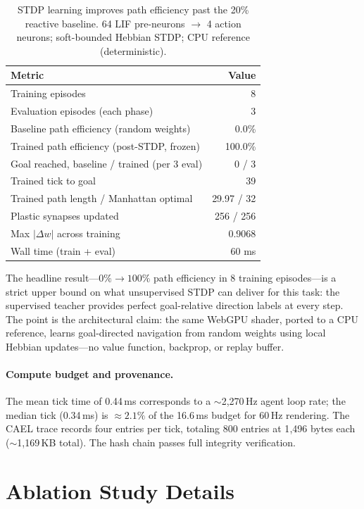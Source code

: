 \documentclass[10pt]{article}
\newcommand{\cael}{CAEL}
\begin{document}
\begin{table}[h]\centering
\caption{STDP learning improves path efficiency past the 20\% reactive baseline.
64 LIF pre-neurons $\to$ 4 action neurons; soft-bounded Hebbian STDP; CPU
reference (deterministic).}
\label{tab:stdp-nav-experiment}
\begin{tabular}{lr}
\toprule
Metric & Value \\
\midrule
Training episodes & 8 \\
Evaluation episodes (each phase) & 3 \\
Baseline path efficiency (random weights) & 0.0\% \\
Trained path efficiency (post-STDP, frozen) & 100.0\% \\
Goal reached, baseline / trained (per 3 eval) & 0 / 3 \\
Trained tick to goal & 39 \\
Trained path length / Manhattan optimal & 29.97 / 32 \\
Plastic synapses updated & 256 / 256 \\
Max $|\Delta w|$ across training & 0.9068 \\
Wall time (train + eval) & 60 ms \\
\bottomrule
\end{tabular}\end{table}

The headline result---$0\%\to100\%$ path efficiency in 8 training
episodes---is a strict upper bound on what unsupervised STDP can deliver for
this task: the supervised teacher provides perfect goal-relative direction
labels at every step. The point is the architectural claim: the same WebGPU
shader, ported to a CPU reference, learns goal-directed navigation from random
weights using local Hebbian updates---no value function, backprop, or replay
buffer.

\paragraph{Compute budget and provenance.}
The mean tick time of 0.44\,ms corresponds to a $\sim$2{,}270\,Hz agent loop
rate; the median tick (0.34\,ms) is $\approx2.1\%$ of the 16.6\,ms budget for
60\,Hz rendering. The \cael{} trace records four entries per tick, totaling 800
entries at 1{,}496 bytes each ($\sim$1{,}169\,KB total). The hash chain passes
full integrity verification.

\section{Ablation Study Details}
\label{supp:ablation}
\end{document}
